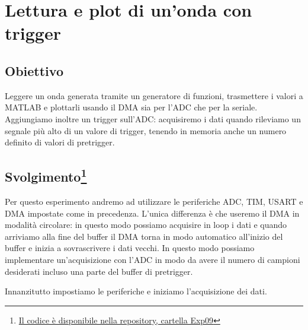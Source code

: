 \chapter{Lettura e plot di un'onda con trigger}
\label{chap:adc_trigger}

\section*{Obiettivo}
Leggere un onda generata tramite un generatore di funzioni, trasmettere i valori a MATLAB e plottarli usando il DMA sia per l'ADC che per la seriale. Aggiungiamo inoltre un trigger sull'ADC: acquisiremo i dati quando rileviamo un segnale più alto di un valore di trigger, tenendo in memoria anche un numero definito di valori di pretrigger.

\section*{Svolgimento\footnote{\href{https://github.com/fdila/electronics-experimentation/tree/main/Exp09}{Il codice è disponibile nella repository, cartella Exp09}}}

Per questo esperimento andremo ad utilizzare le periferiche ADC, TIM, USART e DMA impostate come in precedenza.
L'unica differenza è che useremo il DMA in modalità circolare: in questo modo possiamo acquisire in loop i dati e quando arriviamo alla fine del buffer il DMA torna in modo automatico all'inizio del buffer e inizia a sovrascrivere i dati vecchi.
In questo modo possiamo implementare un'acquisizione con l'ADC in modo da avere il numero di campioni desiderati incluso una parte del buffer di pretrigger.

Innanzitutto impostiamo le periferiche e iniziamo l'acquisizione dei dati.


